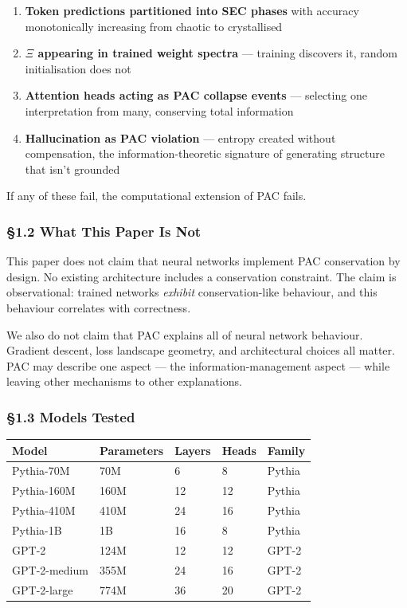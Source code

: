 \documentclass[
  11pt,
  a4paper]{article}
\providecommand{\tightlist}{%
  \setlength{\itemsep}{0pt}\setlength{\parskip}{0pt}}
\begin{document}
\begin{enumerate}
\def\labelenumi{\arabic{enumi}.}
\tightlist
\item
  \textbf{Token predictions partitioned into SEC phases} with accuracy
  monotonically increasing from chaotic to crystallised
\item
  \textbf{\(\Xi\) appearing in trained weight spectra} --- training
  discovers it, random initialisation does not
\item
  \textbf{Attention heads acting as PAC collapse events} --- selecting
  one interpretation from many, conserving total information
\item
  \textbf{Hallucination as PAC violation} --- entropy created without
  compensation, the information-theoretic signature of generating
  structure that isn't grounded
\end{enumerate}

If any of these fail, the computational extension of PAC fails.

\subsubsection{§1.2 What This Paper Is
Not}\label{what-this-paper-is-not}

This paper does not claim that neural networks implement PAC
conservation by design. No existing architecture includes a conservation
constraint. The claim is observational: trained networks \emph{exhibit}
conservation-like behaviour, and this behaviour correlates with
correctness.

We also do not claim that PAC explains all of neural network behaviour.
Gradient descent, loss landscape geometry, and architectural choices all
matter. PAC may describe one aspect --- the information-management
aspect --- while leaving other mechanisms to other explanations.

\subsubsection{§1.3 Models Tested}\label{models-tested}

\begin{longtable}[]{@{}lllll@{}}
\toprule\noalign{}
Model & Parameters & Layers & Heads & Family \\
\midrule\noalign{}
\endhead
\bottomrule\noalign{}
\endlastfoot
Pythia-70M & 70M & 6 & 8 & Pythia \\
Pythia-160M & 160M & 12 & 12 & Pythia \\
Pythia-410M & 410M & 24 & 16 & Pythia \\
Pythia-1B & 1B & 16 & 8 & Pythia \\
GPT-2 & 124M & 12 & 12 & GPT-2 \\
GPT-2-medium & 355M & 24 & 16 & GPT-2 \\
GPT-2-large & 774M & 36 & 20 & GPT-2 \\
\end{longtable}
\end{document}
